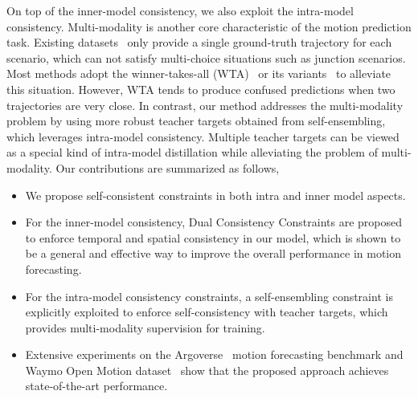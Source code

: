 \documentclass[10pt,twocolumn,letterpaper]{article}
\begin{document}
On top of the inner-model consistency, we also exploit the intra-model consistency. Multi-modality is another core characteristic of the motion prediction task. Existing datasets~\cite{chang2019argoverse,sun2020scalability} only provide a single ground-truth trajectory for each scenario, which can not satisfy multi-choice situations such as junction scenarios. Most methods adopt the winner-takes-all (WTA)~\cite{lee2016stochastic} or its variants~\cite{breuer2021quo,narayanan2021divide} to alleviate this situation. However, WTA tends to produce confused predictions when two trajectories are very close. In contrast, our method addresses the multi-modality problem by using more robust teacher targets obtained from self-ensembling, which leverages intra-model consistency. Multiple teacher targets can be viewed as a special kind of intra-model distillation while alleviating the problem of multi-modality.   Our contributions are summarized as follows,







\begin{itemize}[noitemsep,topsep=2pt] 
\item We propose self-consistent constraints in both intra and inner model aspects. 
\item For the inner-model consistency, Dual Consistency Constraints are proposed to enforce temporal and spatial consistency in our model, which is shown to be a general and effective way to improve the overall performance in motion forecasting.
\item For the intra-model consistency constraints, a self-ensembling constraint  is explicitly exploited  to enforce self-consistency with teacher targets, which provides multi-modality supervision for training.
\item Extensive experiments on the Argoverse~\cite{chang2019argoverse} motion forecasting benchmark and Waymo Open Motion dataset~\cite{ettinger2021large} show that the proposed approach achieves state-of-the-art performance.
\end{itemize}
\end{document}
